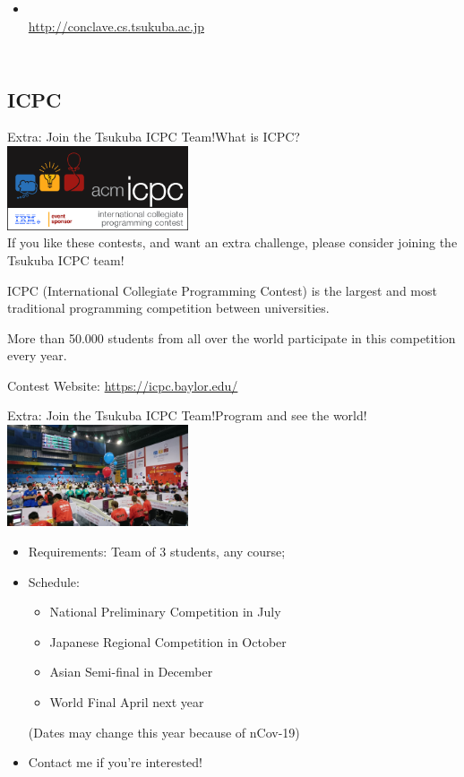 \begin{frame}
\begin{columns}
{\begin{itemize}
      \item {}\\ {\smaller \url{http://conclave.cs.tsukuba.ac.jp}}
    \end{itemize}
    }
  \end{columns}
\end{frame}

\subsection{ICPC}
\begin{frame}{Extra: Join the Tsukuba ICPC Team!}{What is ICPC?}
  \hfill \includegraphics[width=0.4\textwidth]{img/icpclogo}\\
  If you like these contests, and want an extra challenge, please consider
  joining the Tsukuba ICPC team!
  \bigskip

  ICPC (International Collegiate Programming Contest) is the largest and
  most traditional programming competition between universities.
  \bigskip

  More than 50.000 students from all over the world participate in this
  competition every year.
  \bigskip

  Contest Website: \url{https://icpc.baylor.edu/}
\end{frame}

\begin{frame}{Extra: Join the Tsukuba ICPC Team!}{Program and see the world!}
  \hfill \includegraphics[width=0.4\textwidth]{img/icpc_image1}
  \begin{itemize}
    \item \alert{Requirements}: Team of 3 students, any course;
    \medskip

    \item \alert{Schedule:}
    \begin{itemize}
      \item National Preliminary Competition in July
      \item Japanese Regional Competition in October
      \item Asian Semi-final in December
      \item World Final April next year
    \end{itemize}
      (\alert{Dates may change this year because of nCov-19})
    \medskip
    \item Contact me if you're interested!
  \end{itemize}
\end{frame}



